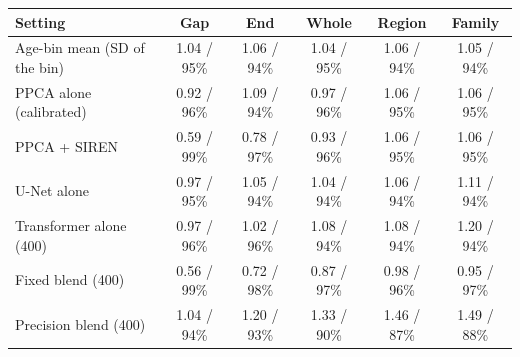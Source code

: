 \begin{tabular}{lccccc}
\toprule
Setting & Gap & End & Whole & Region & Family \\
\midrule
Age-bin mean (SD of the bin) & 1.04 / 95\% & 1.06 / 94\% & 1.04 / 95\% & 1.06 / 94\% & 1.05 / 94\% \\
PPCA alone (calibrated) & 0.92 / 96\% & 1.09 / 94\% & 0.97 / 96\% & 1.06 / 95\% & 1.06 / 95\% \\
PPCA + SIREN & 0.59 / 99\% & 0.78 / 97\% & 0.93 / 96\% & 1.06 / 95\% & 1.06 / 95\% \\
U-Net alone & 0.97 / 95\% & 1.05 / 94\% & 1.04 / 94\% & 1.06 / 94\% & 1.11 / 94\% \\
Transformer alone (400) & 0.97 / 96\% & 1.02 / 96\% & 1.08 / 94\% & 1.08 / 94\% & 1.20 / 94\% \\
Fixed blend (400) & 0.56 / 99\% & 0.72 / 98\% & 0.87 / 97\% & 0.98 / 96\% & 0.95 / 97\% \\
Precision blend (400) & 1.04 / 94\% & 1.20 / 93\% & 1.33 / 90\% & 1.46 / 87\% & 1.49 / 88\% \\
\bottomrule
\end{tabular}

